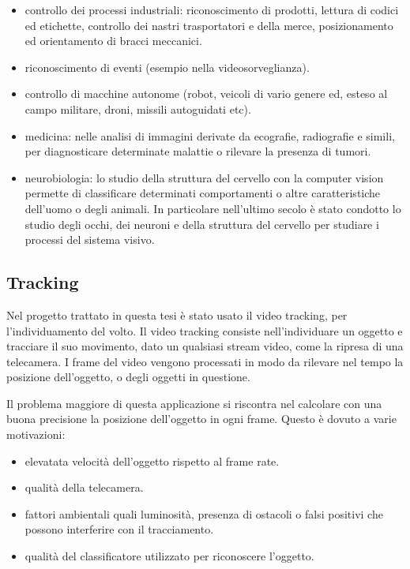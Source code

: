 \begin{itemize}
\item controllo dei processi industriali: riconoscimento di prodotti, lettura di codici ed etichette, controllo dei nastri trasportatori e della merce, posizionamento ed orientamento di bracci meccanici.
\item riconoscimento di eventi (esempio nella videosorveglianza).

\item controllo di macchine autonome (robot, veicoli di vario genere ed, esteso al campo militare, droni, missili autoguidati etc).

\item medicina: nelle analisi di immagini derivate da ecografie, radiografie e simili, per diagnosticare determinate malattie o rilevare la presenza di tumori.

\item neurobiologia: lo studio della struttura del cervello con la computer vision permette di classificare determinati comportamenti o altre caratteristiche dell'uomo o degli animali.
In particolare nell'ultimo secolo è stato condotto lo studio degli occhi, dei neuroni e della struttura del cervello per studiare i processi del sistema visivo. 

\end{itemize}

\subsection{Tracking}
Nel progetto trattato in questa tesi è stato usato il video tracking, per l'individuamento del volto. Il video tracking consiste nell'individuare un oggetto e tracciare il suo movimento, dato un qualsiasi stream video, come la ripresa di una telecamera. I frame del video vengono processati in modo da rilevare nel tempo la posizione dell'oggetto, o degli oggetti in questione. 

Il problema maggiore di questa applicazione si riscontra nel calcolare con una buona precisione la posizione dell'oggetto in ogni frame.
Questo è dovuto a varie motivazioni:
\begin{itemize}
\item elevatata velocità dell'oggetto rispetto al frame rate.
\item qualità della telecamera.
\item fattori ambientali quali luminosità, presenza di ostacoli o falsi positivi che possono interferire con il tracciamento.
\item qualità del classificatore utilizzato per riconoscere l'oggetto.
\end{itemize}

